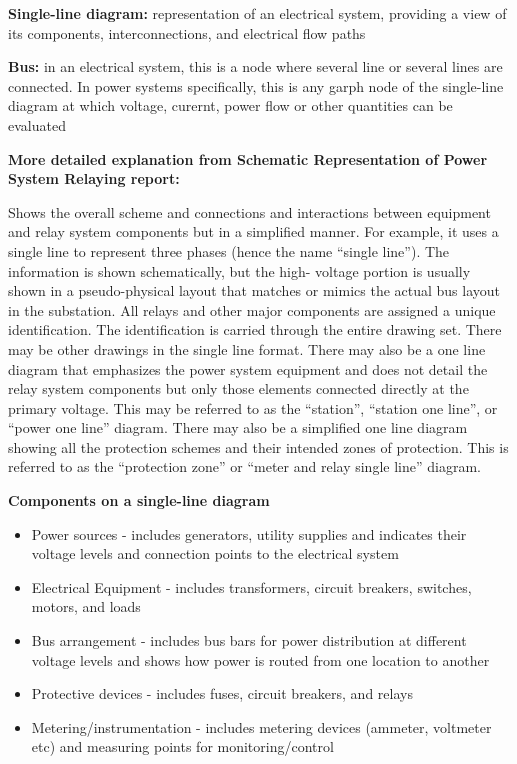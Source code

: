 \begin{define}
    \textbf{Single-line diagram:} representation of an electrical system, providing a view of its components, interconnections, and electrical flow paths

    \textbf{Bus:} in an electrical system, this is a node where several line or several lines are connected. In power systems specifically, this is any garph node of the single-line diagram at which voltage, curernt, power flow or other quantities can be evaluated
\end{define}
\textbf{More detailed explanation from Schematic Representation of Power System Relaying report:}

Shows the overall scheme and connections and interactions between equipment and relay system components but in a simplified manner. For example, it uses a single line to represent three phases (hence the name “single line”). The information is shown schematically, but the high- voltage portion is usually shown in a pseudo-physical layout that matches or mimics the actual bus layout in the substation. All relays and other major components are assigned a unique identification. The identification is carried through the entire drawing set. There may be other drawings in the single line format. There may also be a one line diagram that emphasizes the power system equipment and does not detail the relay system components but only those elements connected directly at the primary voltage. This may be referred to as the “station”, “station one line”, or “power one line” diagram. There may also be a simplified one line diagram showing all the protection schemes and their intended zones of protection. This is referred to as the “protection zone” or “meter and relay single line” diagram.

\textbf{Components on a single-line diagram}
\begin{itemize}
    \item Power sources - includes generators, utility supplies and indicates their voltage levels and connection points to the electrical system
    \item Electrical Equipment - includes transformers, circuit breakers, switches, motors, and loads
    \item Bus arrangement - includes bus bars for power distribution at different voltage levels and shows how power is routed from one location to another
    \item Protective devices - includes fuses, circuit breakers, and relays
    \item Metering/instrumentation - includes metering devices (ammeter, voltmeter etc) and measuring points for monitoring/control
\end{itemize}

